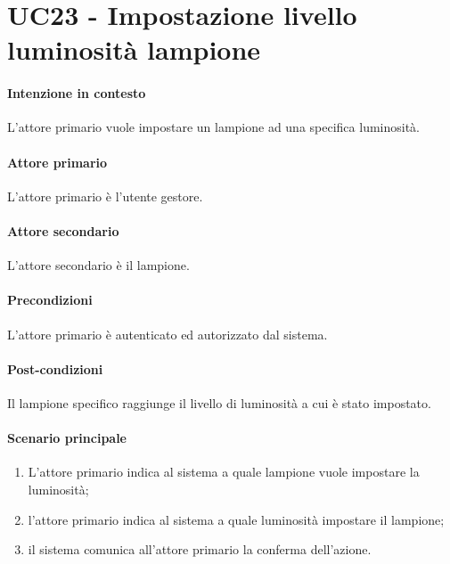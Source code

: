 \section{UC23 - Impostazione livello luminosità lampione}\label{uc:23}
\paragraph{Intenzione in contesto} L'attore primario vuole impostare un lampione ad una specifica luminosità.

\paragraph{Attore primario} L'attore primario è l'utente gestore.

\paragraph{Attore secondario} L'attore secondario è il lampione.

\paragraph{Precondizioni} L'attore primario è autenticato ed autorizzato dal sistema.

\paragraph{Post-condizioni} Il lampione specifico raggiunge il livello di luminosità a cui è stato impostato.
\paragraph{Scenario principale}
\begin{enumerate}
    \item L'attore primario indica al sistema a quale lampione vuole impostare la luminosità;
    \item l'attore primario indica al sistema a quale luminosità impostare il lampione;
    \item il sistema comunica all'attore primario la conferma dell'azione.
\end{enumerate}